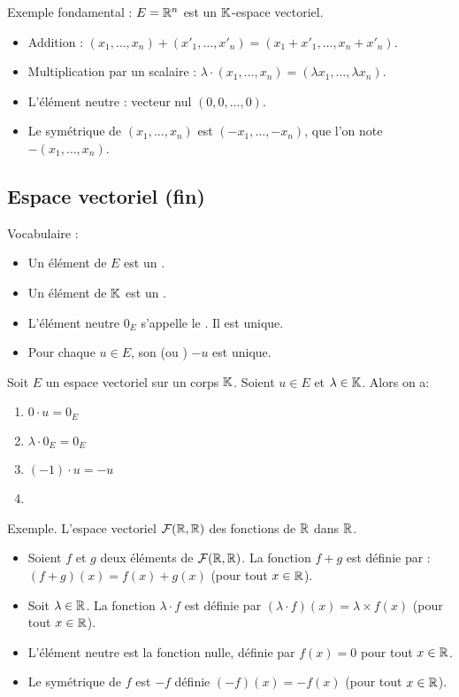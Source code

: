 \documentclass[10pt,class=article,crop=false]{standalone}
\begin{document}
\begin{multicols}{2}
Exemple fondamental : $E=\mathbb{R}^n$ est un $\mathbb{K}$-espace vectoriel.
\begin{itemize}
	\item Addition : $(x_1, \dots , x_n)+(x'_1, \dots , x'_n) = (x_1+x'_1, \dots , x_n+x'_n)$. 
	\item Multiplication par un scalaire : $\lambda \cdot (x_1, \dots , x_n)=(\lambda x_1,\dots ,  \lambda x_n)$.
    \item L'élément neutre : vecteur nul $(0,0, \dots, 0)$.
    \item Le symétrique de $(x_1, \dots , x_n)$ est $(-x_1, \dots , -x_n)$, que l'on note $-(x_1, \dots , x_n)$.
\end{itemize}		




\subsection{Espace vectoriel (fin)}

Vocabulaire :
\begin{itemize}
	\item Un élément de $E$ est un .
	\item Un élément de $\mathbb{K}$ est un .
	\item L'élément neutre $0_E$ s'appelle le . Il est unique.
	\item Pour chaque $u\in E$, son  (ou ) $-u$ est unique.
\end{itemize}

\begin{proposition}
	Soit $E$ un espace vectoriel sur un corps $\mathbb{K}$. Soient $u \in E$ et $\lambda \in \mathbb{K}$.
	Alors on a:
	\begin{enumerate}
		\item $0 \cdot u = 0_E$
		\item $\lambda \cdot 0_E = 0_E$
		\item $(-1)\cdot u = -u$
		\item {}
	\end{enumerate}
\end{proposition}


Exemple. L'espace vectoriel $\mathcal{F}(\mathbb{R}, \mathbb{R})$ des fonctions de $\mathbb{R}$ dans $\mathbb{R}$.		
\begin{itemize}
	\item Soient $f$ et $g$ deux éléments de $\mathcal{F}(\mathbb{R}, \mathbb{R})$. La fonction $f+g$ est définie par  : $(f+g)(x)=f(x)+g(x)$ (pour tout $x\in\mathbb{R}$).
	\item Soit $\lambda \in \mathbb{R}$. La fonction
	$\lambda \cdot f$ est définie par $(\lambda \cdot f) (x)=\lambda \times f (x)$ (pour tout $x\in\mathbb{R}$).
	\item L'élément neutre est la fonction nulle, définie par $f(x)=0$ pour tout $x\in\mathbb{R}$.
	\item Le symétrique de $f$ est $-f$ définie $(-f)(x) = -f(x)$ (pour tout $x\in\mathbb{R}$).
\end{itemize}
	


\end{multicols}
\end{document}
